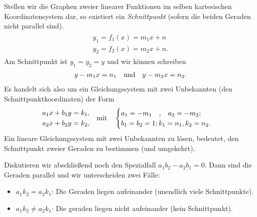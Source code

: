 \begin{wrapfigure}{r}{.6\textwidth}
        \centering
        \vspace{-.5cm}
        \vspace{-1cm}
\end{wrapfigure}
Stellen wir die Graphen zweier linearer Funktionen im selben kartesischen Koordinatensystem dar, so existiert ein \emph{Schnittpunkt} (sofern die beiden Geraden nicht parallel sind).
\begin{align}
    \begin{split}
        y_1 = f_1(x) = m_1 x + n \\
        y_2 = f_2(x) = m_2 x + n.
    \end{split}
\end{align}
Am Schnittpunkt ist $y_1 = y_2 = y$ und wir können schreiben 
\begin{align}
    y - m_1 x = n_1  \qq{und} y - m_2 x = n_2.
\end{align}
Es handelt sich also um ein Gleichungssystem mit zwei Unbekannten (den Schnittpunktkoordinaten) der Form 
\begin{align}
    \begin{split}
        a_1 x + b_1 y &= k_1, \\
        a_2 x + b_2 y &= k_2,
    \end{split} \qq{mit} \begin{cases}
        a_1 = -m_1\qq{,} a_2 = -m_2; \\
        b_1 = b_2 = 1; k_1 = n_1, k_2 = n_2.
    \end{cases}
\end{align}
Ein lineare Gleichungssystem mit zwei Unbekannten zu lösen, bedeutet, den Schnittpunkt zweier Geraden zu bestimmen (und umgekehrt).

Diskutieren wir abschließend noch den Spezialfall $a_1 b_2 - a_2 b_1 = 0$. Dann sind die Geraden parallel und wir unterscheiden zwei Fälle: 
\begin{itemize}
    \item $a_1 k_2 = a_2 k_1$: Die Geraden liegen aufeinander (unendlich viele Schnittpunkte).
    \item $a_1 k_2 \neq a_2 k_1$: Die geraden liegen nicht aufeinander (kein Schnittpunkt).
\end{itemize}

